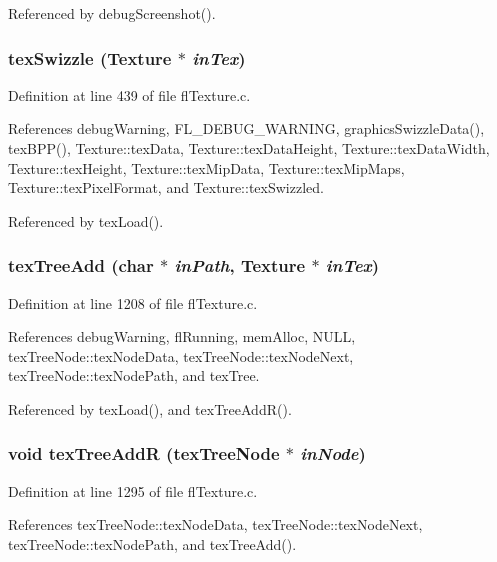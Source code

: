 Referenced by debug\-Screenshot().
\subsubsection{ tex\-Swizzle ({\bf Texture} $\ast$ {\em in\-Tex})}\label{flTexture_8c_30b31c0af73bf82ad9236a981a812eec}




Definition at line 439 of file fl\-Texture.c.

References debug\-Warning, FL\_\-DEBUG\_\-WARNING, graphics\-Swizzle\-Data(), tex\-BPP(), Texture::tex\-Data, Texture::tex\-Data\-Height, Texture::tex\-Data\-Width, Texture::tex\-Height, Texture::tex\-Mip\-Data, Texture::tex\-Mip\-Maps, Texture::tex\-Pixel\-Format, and Texture::tex\-Swizzled.

Referenced by tex\-Load().
\subsubsection{ tex\-Tree\-Add (char $\ast$ {\em in\-Path}, {\bf Texture} $\ast$ {\em in\-Tex})}\label{flTexture_8c_acb29d67427aa933809ac424ae4b6a66}




Definition at line 1208 of file fl\-Texture.c.

References debug\-Warning, fl\-Running, mem\-Alloc, NULL, tex\-Tree\-Node::tex\-Node\-Data, tex\-Tree\-Node::tex\-Node\-Next, tex\-Tree\-Node::tex\-Node\-Path, and tex\-Tree.

Referenced by tex\-Load(), and tex\-Tree\-Add\-R().
\subsubsection{\setlength{\rightskip}{0pt plus 5cm}void tex\-Tree\-Add\-R ({\bf tex\-Tree\-Node} $\ast$ {\em in\-Node})}\label{flTexture_8c_70c464d6c099508464c9ebd5ffda2989}




Definition at line 1295 of file fl\-Texture.c.

References tex\-Tree\-Node::tex\-Node\-Data, tex\-Tree\-Node::tex\-Node\-Next, tex\-Tree\-Node::tex\-Node\-Path, and tex\-Tree\-Add().

